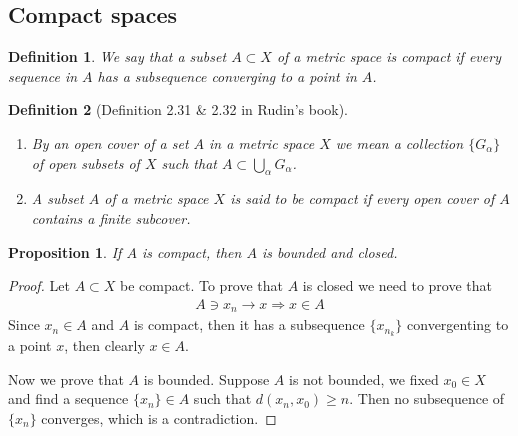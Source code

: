 \documentclass[12pt,leqno]{amsart}
\newtheorem{definition}{Definition}[section]
\newtheorem{proposition}{Proposition}[section]
\theoremstyle{definition}
\numberwithin{equation}{subsection}
\begin{document}
\medskip

\subsection{Compact spaces}
\begin{definition}
We say that a subset $A\subset X$ of a metric space is compact if every sequence in $A$ has a subsequence converging to a point in $A$.
\end{definition}

\begin{definition}[Definition 2.31 \& 2.32 in Rudin's book]
$ $
\begin{enumerate}
    \item By an open cover of a set $A$ in a metric space $X$ we mean a collection $\{G_\alpha\}$ of open subsets of $X$ such that $A\subset \bigcup_\alpha G_\alpha$.
    \item A subset $A$ of a metric space $X$ is said to be compact if every open cover of $A$ contains a finite subcover.
\end{enumerate}
\end{definition}

\begin{proposition}
If $A$ is compact, then $A$ is bounded and closed.
\end{proposition}
\begin{proof}
Let $A\subset X$ be compact. To prove that $A$ is closed we need to prove that 
\begin{align*}
    A\ni x_n\to x \Rightarrow x\in A
\end{align*}
Since $x_n\in A$ and $A$ is compact, then it has a subsequence $\{x_{n_k}\}$ convergenting to a point $x$, then clearly $x\in A$. 

Now we prove that $A$ is bounded. Suppose $A$ is not bounded, we fixed $x_0\in X$ and find a sequence $\{x_n\}\in A$ such that $d(x_n, x_0) \geq n$. Then no subsequence of $\{x_n\}$ converges, which is a contradiction.
\end{proof}
\end{document}

